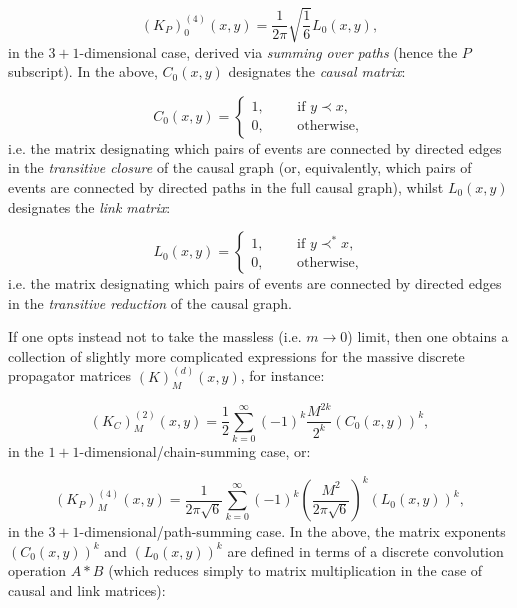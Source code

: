 \documentclass{article}
\begin{document}
\begin{equation}
\left( K_P \right)_{0}^{\left( 4 \right)} \left( x,  y\right) = \frac{1}{2 \pi} \sqrt{\frac{1}{6}} L_0 \left( x, y \right),
\end{equation}
in the ${3 + 1}$-dimensional case, derived via \textit{summing over paths} (hence the $P$ subscript). In the above, ${C_0 \left( x, y \right)}$ designates the \textit{causal matrix}:

\begin{equation}
C_0 \left( x, y \right) = \begin{cases}
1, \qquad \text{ if } y \prec x,\\
0, \qquad \text{ otherwise},
\end{cases}
\end{equation}
i.e. the matrix designating which pairs of events are connected by directed edges in the \textit{transitive closure} of the causal graph (or, equivalently, which pairs of events are connected by directed paths in the full causal graph), whilst ${L_0 \left( x, y \right)}$ designates the \textit{link matrix}:

\begin{equation}
L_0 \left( x, y \right) = \begin{cases}
1, \qquad \text{ if } y \prec^{*} x,\\
0, \qquad \text{ otherwise},
\end{cases}
\end{equation}
i.e. the matrix designating which pairs of events are connected by directed edges in the \textit{transitive reduction} of the causal graph.

If one opts instead not to take the massless (i.e. ${m \to 0}$) limit, then one obtains a collection of slightly more complicated expressions for the massive discrete propagator matrices ${\left( K \right)_{M}^{\left( d \right)} \left( x, y \right)}$, for instance:

\begin{equation}
\left( K_C \right)_{M}^{\left( 2 \right)} \left( x, y \right) = \frac{1}{2} \sum_{k = 0}^{\infty} \left( -1 \right)^k \frac{M^{2 k}}{2^k} \left( C_0 \left( x, y \right) \right)^k,
\end{equation}
in the ${1 + 1}$-dimensional/chain-summing case, or:

\begin{equation}
\left( K_P \right)_{M}^{\left( 4 \right)} \left( x, y \right) = \frac{1}{2 \pi \sqrt{6}} \sum_{k = 0}^{\infty} \left( -1 \right)^k \left( \frac{M^2}{2 \pi \sqrt{6}} \right)^k \left( L_0 \left( x, y \right) \right)^k,
\end{equation}
in the ${3 + 1}$-dimensional/path-summing case. In the above, the matrix exponents ${\left( C_0 \left( x, y \right) \right)^k}$ and ${\left( L_0 \left( x, y \right) \right)^k}$ are defined in terms of a discrete convolution operation ${A * B}$ (which reduces simply to matrix multiplication in the case of causal and link matrices):
\end{document}
